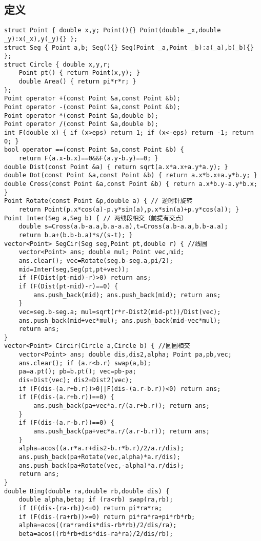 \documentclass[landscape,a4paper]{article}
\begin{document}
\subsection{定义}
\begin{lstlisting}
struct Point { double x,y; Point(){} Point(double _x,double _y):x(_x),y(_y){} };
struct Seg { Point a,b; Seg(){} Seg(Point _a,Point _b):a(_a),b(_b){} };
struct Circle { double x,y,r;
	Point pt() { return Point(x,y); }
	double Area() { return pi*r*r; }
};
Point operator +(const Point &a,const Point &b);
Point operator -(const Point &a,const Point &b);
Point operator *(const Point &a,double b);
Point operator /(const Point &a,double b);
int F(double x) { if (x>eps) return 1; if (x<-eps) return -1; return 0; }
bool operator ==(const Point &a,const Point &b) {
	return F(a.x-b.x)==0&&F(a.y-b.y)==0; }
double Dist(const Point &a) { return sqrt(a.x*a.x+a.y*a.y); }
double Dot(const Point &a,const Point &b) { return a.x*b.x+a.y*b.y; }
double Cross(const Point &a,const Point &b) { return a.x*b.y-a.y*b.x; }
Point Rotate(const Point &p,double a) { // 逆时针旋转
	return Point(p.x*cos(a)-p.y*sin(a),p.x*sin(a)+p.y*cos(a)); }
Point Inter(Seg a,Seg b) { // 两线段相交（前提有交点）
	double s=Cross(a.b-a.a,b.a-a.a),t=Cross(a.b-a.a,b.b-a.a);
	return b.a+(b.b-b.a)*s/(s-t); }
vector<Point> SegCir(Seg seg,Point pt,double r) { //线圆
	vector<Point> ans; double mul; Point vec,mid;
	ans.clear(); vec=Rotate(seg.b-seg.a,pi/2);
	mid=Inter(seg,Seg(pt,pt+vec));
	if (F(Dist(pt-mid)-r)>0) return ans;
	if (F(Dist(pt-mid)-r)==0) {
		ans.push_back(mid); ans.push_back(mid); return ans;
	}
	vec=seg.b-seg.a; mul=sqrt(r*r-Dist2(mid-pt))/Dist(vec);
	ans.push_back(mid+vec*mul); ans.push_back(mid-vec*mul);
	return ans;
}
vector<Point> Circir(Circle a,Circle b) { //圆圆相交
	vector<Point> ans; double dis,dis2,alpha; Point pa,pb,vec;
	ans.clear(); if (a.r<b.r) swap(a,b);
	pa=a.pt(); pb=b.pt(); vec=pb-pa;
	dis=Dist(vec); dis2=Dist2(vec);
	if (F(dis-(a.r+b.r))>0||F(dis-(a.r-b.r))<0) return ans;
	if (F(dis-(a.r+b.r))==0) {
		ans.push_back(pa+vec*a.r/(a.r+b.r)); return ans;
    }
	if (F(dis-(a.r-b.r))==0) {
		ans.push_back(pa+vec*a.r/(a.r-b.r)); return ans;
	}
	alpha=acos((a.r*a.r+dis2-b.r*b.r)/2/a.r/dis);
	ans.push_back(pa+Rotate(vec,alpha)*a.r/dis);
	ans.push_back(pa+Rotate(vec,-alpha)*a.r/dis);
	return ans;
}
double Bing(double ra,double rb,double dis) {
	double alpha,beta; if (ra<rb) swap(ra,rb);
	if (F(dis-(ra-rb))<=0) return pi*ra*ra;
	if (F(dis-(ra+rb))>=0) return pi*ra*ra+pi*rb*rb;
	alpha=acos((ra*ra+dis*dis-rb*rb)/2/dis/ra);
	beta=acos((rb*rb+dis*dis-ra*ra)/2/dis/rb);

\end{lstlisting}
\end{document}
